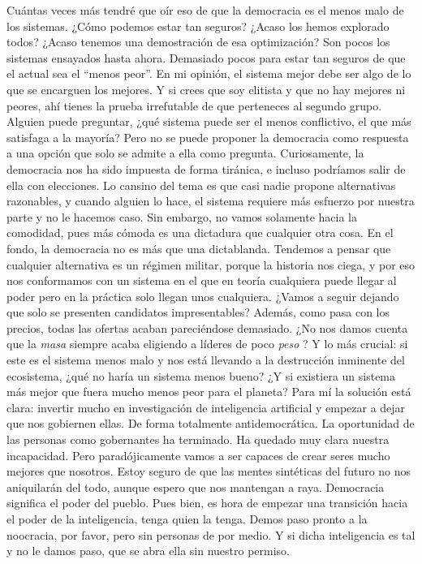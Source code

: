 \documentclass[a4paper,11pt,openright,twocolumn]{book}
\begin{document}
Cuántas veces más tendré que oír eso de que la democracia es el menos malo de los sistemas. ¿Cómo podemos
estar tan seguros? ¿Acaso los hemos explorado todos? ¿Acaso tenemos una demostración de esa optimización?
Son pocos los sistemas ensayados hasta ahora. Demasiado pocos para estar tan seguros de que el actual sea
el ``menos peor''. En mi opinión, el sistema mejor debe ser algo de lo que se encarguen los mejores. Y si crees
que soy elitista y que no hay mejores ni peores, ahí tienes la prueba irrefutable de que perteneces al segundo
grupo. Alguien puede preguntar, ¿qué sistema puede ser el menos conflictivo, el que más satisfaga a la mayoría?
Pero no se puede proponer la democracia como respuesta a una opción que solo se admite a ella como pregunta. 
Curiosamente, la democracia nos ha sido impuesta de forma tiránica, e incluso podríamos salir de ella con
elecciones. Lo cansino del tema es que casi nadie propone alternativas razonables, y cuando alguien lo hace,
el sistema requiere más esfuerzo por nuestra parte y no le hacemos caso. Sin embargo, no vamos solamente hacia la comodidad, pues
más cómoda es una dictadura que cualquier otra cosa. En el fondo, la democracia no es más que una dictablanda.
Tendemos a pensar
que cualquier alternativa es un régimen militar, porque la historia nos ciega, y por eso nos conformamos
con un sistema en el que en teoría cualquiera puede llegar al poder pero en la práctica solo llegan unos
cualquiera. ¿Vamos a seguir dejando que solo se presenten candidatos impresentables? Además, como pasa
con los precios, todas las ofertas acaban pareciéndose demasiado. ¿No nos damos cuenta que la {\it masa}   siempre
acaba eligiendo a líderes de poco {\it peso}  ? Y lo más crucial: si este es el sistema menos malo y nos está
llevando a la destrucción inminente del ecosistema, ¿qué no haría un sistema menos bueno? ¿Y si existiera un sistema
más mejor que fuera mucho menos peor para el planeta? Para mí la solución está clara: invertir mucho en investigación
de inteligencia artificial y empezar a dejar que nos gobiernen ellas. De forma totalmente antidemocrática. La oportunidad
de las personas como gobernantes ha terminado. Ha quedado muy clara nuestra incapacidad. Pero paradójicamente vamos
a ser capaces de crear seres mucho mejores que nosotros. Estoy seguro de que las mentes sintéticas del futuro no nos
aniquilarán del todo, aunque espero que nos mantengan a raya. Democracia significa el poder del pueblo. Pues bien,
es hora de empezar una transición hacia el poder de la inteligencia, tenga quien la tenga. Demos paso pronto a la 
noocracia, por favor, pero sin personas de por medio. Y si dicha inteligencia es tal y no le damos paso, que se
abra ella sin nuestro permiso.
\end{document}
